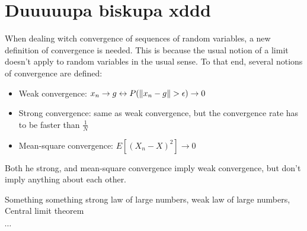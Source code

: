 \chapter{Duuuuupa biskupa xddd}


{
When dealing witch convergence of sequences of random variables, a new definition of convergence is needed. This is because the usual notion of a limit doesn't apply to random variables in the usual sense. To that end, several notions of convergence are defined:
\begin{itemize}
    \item Weak convergence: $x_n \rightarrow g \leftrightarrow P(\lVert x_n-g\rVert > \epsilon ) \rightarrow 0$
        \item Strong convergence: same as weak convergence, but the convergence rate has to be faster than $\frac{1}{N}$
        \item Mean-square convergence: $E[(X_n-X)^{2}] \rightarrow  0$
\end{itemize}



Both he strong, and mean-square convergence imply weak convergence, but don't imply anything about each other.

Something something strong law of large numbers, weak law of large numbers, Central limit theorem

$\cdots $
}


